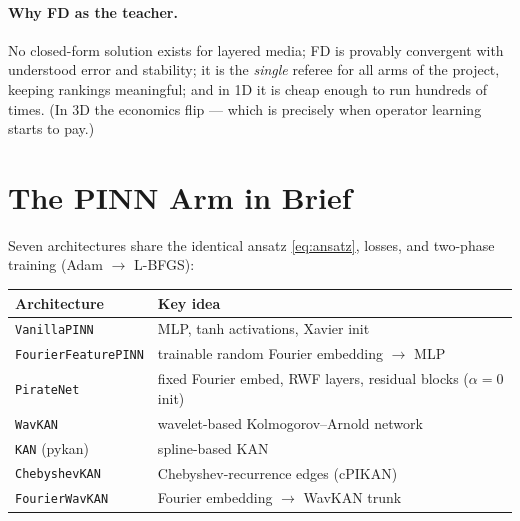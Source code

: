 \documentclass[11pt,a4paper]{article}
\begin{document}
\paragraph{Why FD as the teacher.} No closed-form solution exists for layered
media; FD is provably convergent with understood error and stability; it is the
\emph{single} referee for all arms of the project, keeping rankings meaningful;
and in 1D it is cheap enough to run hundreds of times. (In 3D the economics
flip --- which is precisely when operator learning starts to pay.)

\section{The PINN Arm in Brief}

Seven architectures share the identical ansatz \eqref{eq:ansatz}, losses, and
two-phase training (Adam $\to$ L-BFGS):

\begin{center}
\begin{tabular}{@{}ll@{}}
\toprule
Architecture & Key idea \\
\midrule
\texttt{VanillaPINN}       & MLP, tanh activations, Xavier init \\
\texttt{FourierFeaturePINN}& trainable random Fourier embedding $\to$ MLP \\
\texttt{PirateNet}         & fixed Fourier embed, RWF layers, residual blocks ($\alpha{=}0$ init) \\
\texttt{WavKAN}            & wavelet-based Kolmogorov--Arnold network \\
\texttt{KAN} (pykan)       & spline-based KAN \\
\texttt{ChebyshevKAN}      & Chebyshev-recurrence edges (cPIKAN) \\
\texttt{FourierWavKAN}     & Fourier embedding $\to$ WavKAN trunk \\
\bottomrule
\end{tabular}
\end{center}
\end{document}
